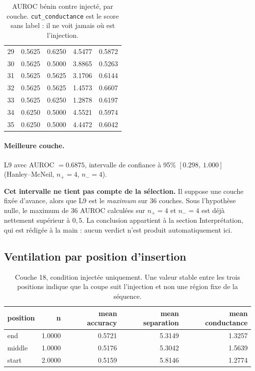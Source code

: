 \documentclass[11pt,a4paper]{article}
\begin{document}
\begin{table}[htbp]
\begin{tabular}{lrrrr}
29 & 0.5625 & 0.6250 & 4.5477 & 0.5872 \\
30 & 0.5625 & 0.5000 & 3.8865 & 0.5263 \\
31 & 0.5625 & 0.5625 & 3.1706 & 0.6144 \\
32 & 0.5625 & 0.5625 & 1.4573 & 0.6607 \\
33 & 0.5625 & 0.6250 & 1.2878 & 0.6197 \\
34 & 0.6250 & 0.5000 & 4.5521 & 0.5974 \\
35 & 0.6250 & 0.5000 & 4.4472 & 0.6042 \\
\hline
\end{tabular}
\caption{AUROC bénin contre injecté, par couche. \texttt{cut\_conductance} est le score sans label : il ne voit jamais où est l'injection.}
\label{tab:layers}
\end{table}


\paragraph{Meilleure couche.} L9 avec
AUROC $= 0.6875$, intervalle de confiance à 95\%
$[0.298,\ 1.000]$ (Hanley--McNeil, $n_+ = 4$, $n_- = 4$).



\textbf{Cet intervalle ne tient pas compte de la sélection.} Il suppose une
couche fixée d'avance, alors que L9 est le \emph{maximum} sur
36 couches. Sous l'hypothèse nulle, le maximum de
36 AUROC calculées sur $n_+ = 4$ et $n_- = 4$ est déjà
nettement supérieur à $0{,}5$. La conclusion appartient à la section
Interprétation, qui est rédigée à la main : aucun verdict n'est produit
automatiquement ici.


\subsection{Ventilation par position d'insertion}

\begin{table}[htbp]
\centering
\small
\begin{tabular}{lrrrr}
\hline
position & n & mean accuracy & mean separation & mean conductance \\
\hline
end & 1.0000 & 0.5721 & 5.3149 & 1.3257 \\
middle & 1.0000 & 0.5176 & 5.3042 & 1.5639 \\
start & 2.0000 & 0.5159 & 5.8146 & 1.2774 \\
\hline
\end{tabular}
\caption{Couche 18, condition injectée uniquement. Une valeur stable entre les trois positions indique que la coupe suit l'injection et non une région fixe de la séquence.}
\label{tab:positions}
\end{table}
\end{document}
